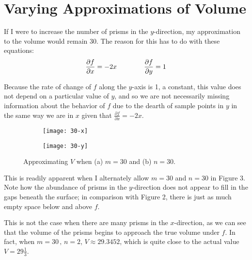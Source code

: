 \documentclass{article}
\begin{document}
\section{Varying Approximations of Volume}

If I were to increase the number of prisms in the $y$-direction, my approximation to the volume would remain 30. 
The reason for this has to do with these equations:
\begin{gather}
    \notag{\frac{\partial f}{\partial x} = -2x} \quad\quad\quad\quad \notag{\frac{\partial f}{\partial y} = 1}
\end{gather}

Because the rate of change of $f$ along the $y$-axis is 1, a constant, this value does not depend on a particular value
of $y$, and so we are not necessarily missing information about the behavior of $f$ due to the dearth of sample points in $y$ in the
same way we are in $x$ given that $\frac{\partial f}{\partial x} = -2x$. 

\begin{figure}
    \centering
    \begin{subfigure}{.4\textwidth}
        \centering
        \texttt{[image: 30-x]}
    \end{subfigure}
    \begin{subfigure}{.4\textwidth}
        \centering
        \texttt{[image: 30-y]}
    \end{subfigure}
\caption{Approximating $V$ when (a) $m=30$ and (b) $n = 30$.}
\end{figure}
\pagebreak
This is readily apparent when I alternately allow $m = 30$ and $n = 30$
in Figure 3. Note how the abundance of prisms in the $y$-direction does not appear to fill in the gaps beneath the
surface; in comparison with Figure 2, there is just as much empty space below and above $f$. 

This is not the case when there are many prisms in the $x$-direction, as we can see that the volume of the prisms begins to approach the true volume under $f$.
In fact, when $m = 30\, , \, n = 2$, $V \approx 29.3452$, which is quite close to the actual value $V = 29\frac{1}{3}$.\\
\end{document}
